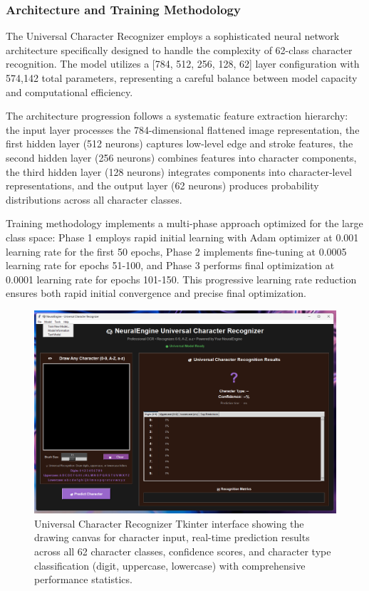 \documentclass[11pt,a4paper]{report}
\begin{document}
\subsubsection{Architecture and Training Methodology}

The Universal Character Recognizer employs a sophisticated neural network architecture specifically designed to handle the complexity of 62-class character recognition. The model utilizes a [784, 512, 256, 128, 62] layer configuration with 574,142 total parameters, representing a careful balance between model capacity and computational efficiency.

The architecture progression follows a systematic feature extraction hierarchy: the input layer processes the 784-dimensional flattened image representation, the first hidden layer (512 neurons) captures low-level edge and stroke features, the second hidden layer (256 neurons) combines features into character components, the third hidden layer (128 neurons) integrates components into character-level representations, and the output layer (62 neurons) produces probability distributions across all character classes.

Training methodology implements a multi-phase approach optimized for the large class space: Phase 1 employs rapid initial learning with Adam optimizer at 0.001 learning rate for the first 50 epochs, Phase 2 implements fine-tuning at 0.0005 learning rate for epochs 51-100, and Phase 3 performs final optimization at 0.0001 learning rate for epochs 101-150. This progressive learning rate reduction ensures both rapid initial convergence and precise final optimization.

\begin{figure}[H]
\centering
\includegraphics[width=\textwidth]{universal_character_recognizer_interface.png}
\caption{Universal Character Recognizer Tkinter interface showing the drawing canvas for character input, real-time prediction results across all 62 character classes, confidence scores, and character type classification (digit, uppercase, lowercase) with comprehensive performance statistics.}
\label{fig:universal_interface}
\end{figure}
\end{document}
